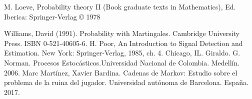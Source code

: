 \documentclass[letterpaper, 10 pt, conference]{ieeeconf}  %
\begin{document}
   












\newpage

\begin{thebibliography}{99}

 M. Loeve, Probability theory II (Book graduate texts in Mathematics), Ed.  Iberica: Springer-Verlag © 1978

Williams, David (1991). Probability with Martingales. Cambridge University Press. ISBN 0-521-40605-6.
 H. Poor, An Introduction to Signal Detection and Estimation.   New York: Springer-Verlag, 1985, ch. 4.
 Chicago, IL.
  Giraldo. G. Norman. Procesos Estocásticos.Universidad Nacional de Colombia. Medellín. 2006. 
 Marc Martínez, Xavier Bardina. Cadenas de Markov:
Estudio sobre el problema de la ruina del jugador. Universidad autónoma de Barcelona. España. 2017.


\end{thebibliography}
\end{document}
